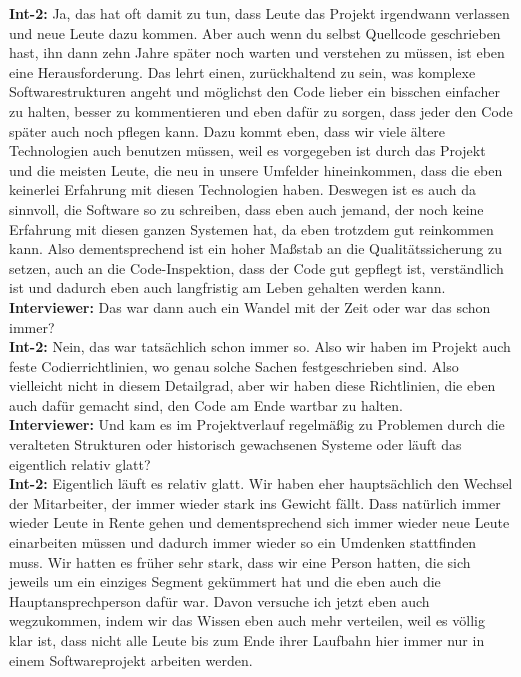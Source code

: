 \textbf{Int-2:} Ja, das hat oft damit zu tun, dass Leute das Projekt irgendwann verlassen und neue Leute dazu kommen. Aber auch wenn du selbst Quellcode geschrieben hast, ihn dann zehn Jahre später noch warten und verstehen zu müssen, ist eben eine Herausforderung. Das lehrt einen, zurückhaltend zu sein, was komplexe Softwarestrukturen angeht und möglichst den Code lieber ein bisschen einfacher zu halten, besser zu kommentieren und eben dafür zu sorgen, dass jeder den Code später auch noch pflegen kann. Dazu kommt eben, dass wir viele ältere Technologien auch benutzen müssen, weil es vorgegeben ist durch das Projekt und die meisten Leute, die neu in unsere Umfelder hineinkommen, dass die eben keinerlei Erfahrung mit diesen Technologien haben. Deswegen ist es auch da sinnvoll, die Software so zu schreiben, dass eben auch jemand, der noch keine Erfahrung mit diesen ganzen Systemen hat, da eben trotzdem gut reinkommen kann. Also dementsprechend ist ein hoher Maßstab an die Qualitätssicherung zu setzen, auch an die Code-Inspektion, dass der Code gut gepflegt ist, verständlich ist und dadurch eben auch langfristig am Leben gehalten werden kann.\\
\textbf{Interviewer:} Das war dann auch ein Wandel mit der Zeit oder war das schon immer? \\
\textbf{Int-2:} Nein, das war tatsächlich schon immer so. Also wir haben im Projekt auch feste Codierrichtlinien, wo genau solche Sachen festgeschrieben sind. Also vielleicht nicht in diesem Detailgrad, aber wir haben diese Richtlinien, die eben auch dafür gemacht sind, den Code am Ende wartbar zu halten.\\
\textbf{Interviewer:} Und kam es im Projektverlauf regelmäßig zu Problemen durch die veralteten Strukturen oder historisch gewachsenen Systeme oder läuft das eigentlich relativ glatt?\\
\textbf{Int-2:} Eigentlich läuft es relativ glatt. Wir haben eher hauptsächlich den Wechsel der Mitarbeiter, der immer wieder stark ins Gewicht fällt. Dass natürlich immer wieder Leute in Rente gehen und dementsprechend sich immer wieder neue Leute einarbeiten müssen und dadurch immer wieder so ein Umdenken stattfinden muss. Wir hatten es früher sehr stark, dass wir eine Person hatten, die sich jeweils um ein einziges Segment gekümmert hat und die eben auch die Hauptansprechperson dafür war. Davon versuche ich jetzt eben auch wegzukommen, indem wir das Wissen eben auch mehr verteilen, weil es völlig klar ist, dass nicht alle Leute bis zum Ende ihrer Laufbahn hier immer nur in einem Softwareprojekt arbeiten werden. \\
